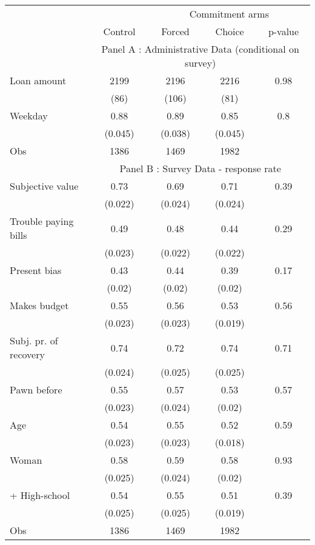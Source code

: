 \begin{tabular}{lcccc}
\toprule
      &       & \multicolumn{3}{c}{Commitment arms} \\
\cmidrule{3-5}      & \multicolumn{1}{p{4.545em}}{Control} & \multicolumn{1}{p{4.955em}}{Forced} & \multicolumn{1}{p{3.455em}}{Choice} & \multicolumn{1}{p{3.455em}}{p-value} \\
\midrule
      & \multicolumn{4}{c}{Panel A : Administrative Data (conditional on survey)} \\
\midrule
\midrule
Loan amount  & 2199  & 2196  & 2216  & 0.98 \\
      & (86)  & (106) & (81)  &  \\
Weekday & 0.88  & 0.89  & 0.85  & 0.8 \\
      & (0.045) & (0.038) & (0.045) &  \\
\midrule
Obs   & 1386  & 1469  & 1982  &  \\
\midrule
      & \multicolumn{4}{c}{Panel B : Survey Data - response rate} \\
\midrule
\midrule
Subjective value & 0.73  & 0.69  & 0.71  & 0.39 \\
      & (0.022) & (0.024) & (0.024) &  \\
Trouble paying bills & 0.49  & 0.48  & 0.44  & 0.29 \\
      & (0.023) & (0.022) & (0.022) &  \\
Present bias & 0.43  & 0.44  & 0.39  & 0.17 \\
      & (0.02) & (0.02) & (0.02) &  \\
Makes budget & 0.55  & 0.56  & 0.53  & 0.56 \\
      & (0.023) & (0.023) & (0.019) &  \\
Subj. pr. of recovery & 0.74  & 0.72  & 0.74  & 0.71 \\
      & (0.024) & (0.025) & (0.025) &  \\
Pawn before & 0.55  & 0.57  & 0.53  & 0.57 \\
      & (0.023) & (0.024) & (0.02) &  \\
Age   & 0.54  & 0.55  & 0.52  & 0.59 \\
      & (0.023) & (0.023) & (0.018) &  \\
Woman & 0.58  & 0.59  & 0.58  & 0.93 \\
      & (0.025) & (0.024) & (0.02) &  \\
+ High-school & 0.54  & 0.55  & 0.51  & 0.39 \\
      & (0.025) & (0.025) & (0.019) &  \\
\midrule
Obs   & 1386  & 1469  & 1982  &  \\
\bottomrule
\bottomrule
\end{tabular}%
